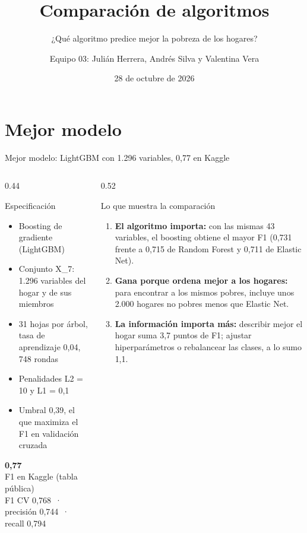 \documentclass[aspectratio=169, 10pt]{beamer}
\title{Comparaci\'on de algoritmos}
\subtitle{¿Qu\'e algoritmo predice mejor la pobreza de los hogares?}
\author{Equipo 03: Juli\'an Herrera, Andr\'es Silva y Valentina Vera}
\institute{MECA 4107 Big Data y Machine Learning para Econom\'ia Aplicada, Universidad de los Andes}
\date{28 de octubre de 2026}
\begin{document}
\maketitle

\section{Mejor modelo}

\begin{frame}{Mejor modelo: LightGBM con 1.296 variables, 0,77 en Kaggle}
  \begin{columns}[T, onlytextwidth]
    \begin{column}{0.44\textwidth}
      \begin{block}{Especificaci\'on}
        \footnotesize
        \begin{itemize}\setlength{\itemsep}{1pt}
          \item Boosting de gradiente (LightGBM)
          \item Conjunto X\_7: 1.296 variables del hogar y de sus miembros
          \item 31 hojas por \'arbol, tasa de aprendizaje 0,04, 748 rondas
          \item Penalidades L2 = 10 y L1 = 0,1
          \item Umbral 0,39, el que maximiza el F1 en validaci\'on cruzada
        \end{itemize}
      \end{block}
      \begin{center}
        {\LARGE\bfseries\color{accent}0,77}\\[0.5mm]
        {\small F1 en Kaggle (tabla p\'ublica)}\\[0.5mm]
        {\scriptsize F1 CV 0,768 \,·\, precisi\'on 0,744 \,·\, recall 0,794}
      \end{center}
    \end{column}
    \begin{column}{0.52\textwidth}
      \begin{block}{Lo que muestra la comparaci\'on}
        \small
        \begin{enumerate}
          \item \textbf{El algoritmo importa:} con las mismas 43 variables, el boosting obtiene el mayor F1 (0,731 frente a 0,715 de Random Forest y 0,711 de Elastic Net).
          \item \textbf{Gana porque ordena mejor a los hogares:} para encontrar a los mismos pobres, incluye unos 2.000 hogares no pobres menos que Elastic Net.
          \item \textbf{La informaci\'on importa m\'as:} describir mejor el hogar suma 3,7 puntos de F1; ajustar hiperpar\'ametros o rebalancear las clases, a lo sumo 1,1.
        \end{enumerate}
      \end{block}
    \end{column}
  \end{columns}
\end{frame}
\end{document}
